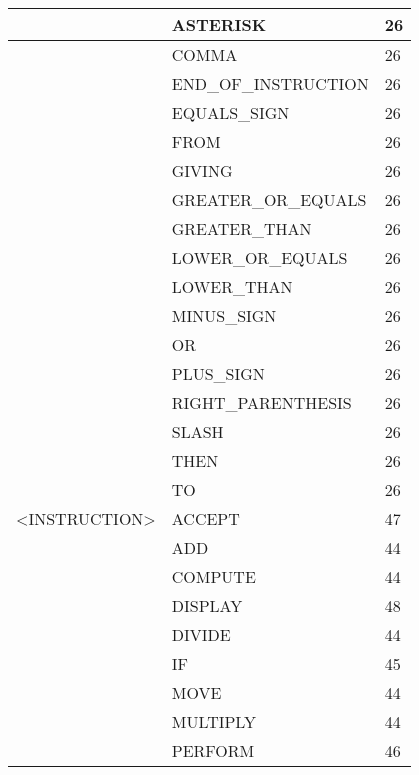 \begin{longtable}{|l|l|l|}
                     &   ASTERISK             &   26 \\ \hline
                     &   COMMA                &   26 \\ \hline
                     &   END\_OF\_INSTRUCTION   &   26 \\ \hline
                     &   EQUALS\_SIGN          &   26 \\ \hline
                     &   FROM                 &   26 \\ \hline
                     &   GIVING               &   26 \\ \hline
                     &   GREATER\_OR\_EQUALS    &   26 \\ \hline
                     &   GREATER\_THAN         &   26 \\ \hline
                     &   LOWER\_OR\_EQUALS      &   26 \\ \hline
                     &   LOWER\_THAN           &   26 \\ \hline
                     &   MINUS\_SIGN           &   26 \\ \hline
                     &   OR                   &   26 \\ \hline
                     &   PLUS\_SIGN            &   26 \\ \hline
                     &   RIGHT\_PARENTHESIS    &   26 \\ \hline
                     &   SLASH                &   26 \\ \hline
                     &   THEN                 &   26 \\ \hline
                     &   TO                   &   26 \\ \hline
<INSTRUCTION>        &   ACCEPT               &   47 \\ \hline
                     &   ADD                  &   44 \\ \hline
                     &   COMPUTE              &   44 \\ \hline
                     &   DISPLAY              &   48 \\ \hline
                     &   DIVIDE               &   44 \\ \hline
                     &   IF                   &   45 \\ \hline
                     &   MOVE                 &   44 \\ \hline
                     &   MULTIPLY             &   44 \\ \hline
                     &   PERFORM              &   46 \\ \hline

\end{longtable}
